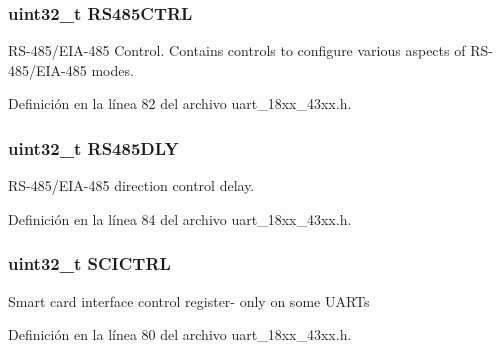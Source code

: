\subsubsection[{\texorpdfstring{R\+S485\+C\+T\+RL}{RS485CTRL}}]{ uint32\+\_\+t R\+S485\+C\+T\+RL}\hypertarget{struct_l_p_c___u_s_a_r_t___t_a8fa050dd8fb88765dfd1d758dc90bf71}{}\label{struct_l_p_c___u_s_a_r_t___t_a8fa050dd8fb88765dfd1d758dc90bf71}
R\+S-\/485/\+E\+I\+A-\/485 Control. Contains controls to configure various aspects of R\+S-\/485/\+E\+I\+A-\/485 modes. 

Definición en la línea 82 del archivo uart\+\_\+18xx\+\_\+43xx.\+h.

\subsubsection[{\texorpdfstring{R\+S485\+D\+LY}{RS485DLY}}]{ uint32\+\_\+t R\+S485\+D\+LY}\hypertarget{struct_l_p_c___u_s_a_r_t___t_a4bc7d4b838c20506b9951f792a35e463}{}\label{struct_l_p_c___u_s_a_r_t___t_a4bc7d4b838c20506b9951f792a35e463}
R\+S-\/485/\+E\+I\+A-\/485 direction control delay. 

Definición en la línea 84 del archivo uart\+\_\+18xx\+\_\+43xx.\+h.

\subsubsection[{\texorpdfstring{S\+C\+I\+C\+T\+RL}{SCICTRL}}]{ uint32\+\_\+t S\+C\+I\+C\+T\+RL}\hypertarget{struct_l_p_c___u_s_a_r_t___t_a6c2492017eca871e198d76f9666b1653}{}\label{struct_l_p_c___u_s_a_r_t___t_a6c2492017eca871e198d76f9666b1653}
Smart card interface control register-\/ only on some U\+A\+R\+Ts 

Definición en la línea 80 del archivo uart\+\_\+18xx\+\_\+43xx.\+h.

